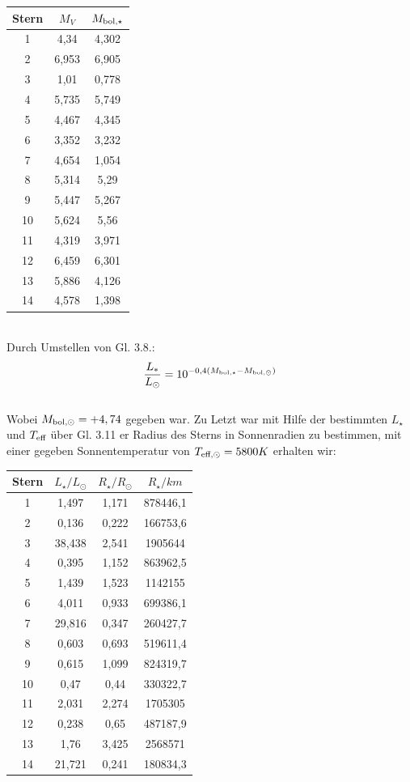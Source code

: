 \documentclass[12pt]{article}
\begin{document}
\newpage\noindent\begin{table}[!ht]
    \centering
    \begin{tabular}{c|c|c}
        Stern & $M_V$ & $M_{\textnormal{bol},\star}$ \\ \hline
        1 & 4,34 & 4,302 \\ 
        2 & 6,953 & 6,905 \\ 
        3 & 1,01 & 0,778 \\ 
        4 & 5,735 & 5,749 \\
        5 & 4,467 & 4,345 \\
        6 & 3,352 & 3,232 \\ 
        7 & 4,654 & 1,054 \\ 
        8 & 5,314 & 5,29 \\ 
        9 & 5,447 & 5,267 \\ 
        10 & 5,624 & 5,56 \\ 
        11 & 4,319 & 3,971 \\ 
        12 & 6,459 & 6,301 \\ 
        13 & 5,886 & 4,126 \\ 
        14 & 4,578 & 1,398 \\ 
    \end{tabular}
\end{table}\\
Durch Umstellen von Gl. 3.8.:
\[\frac{L_*}{L_{\odot}} = 10^{-0,4(M_{\textnormal{bol},\star}-M_{\textnormal{bol},\odot})}\]\\
Wobei $M_{\textnormal{bol},\odot} = +4,74$ gegeben war. Zu Letzt war mit Hilfe der bestimmten $L_\star$ und $T_{\textnormal{eff}}$ über Gl. 3.11 er Radius des Sterns in Sonnenradien zu bestimmen, mit einer gegeben Sonnentemperatur von $T_{\textnormal{eff},\odot} = 5800K$ erhalten wir:
\begin{table}[!ht]
    \centering
    \begin{tabular}{c|c|c|c}
        Stern & $L_\star / L_\odot$ &$R_\star / R_\odot$& $R_\star / km$ \\ \hline
        1 & 1,497 & 1,171 & 878446,1 \\ 
        2 & 0,136 & 0,222 & 166753,6 \\ 
        3 & 38,438 & 2,541 & 1905644 \\ 
        4 & 0,395 & 1,152 & 863962,5 \\ 
        5 & 1,439 & 1,523 & 1142155 \\ 
        6 & 4,011 & 0,933 & 699386,1 \\ 
        7 & 29,816 & 0,347 & 260427,7 \\ 
        8 & 0,603 & 0,693 & 519611,4 \\ 
        9 & 0,615 & 1,099 & 824319,7 \\ 
        10 & 0,47 & 0,44 & 330322,7 \\ 
        11 & 2,031 & 2,274 & 1705305 \\ 
        12 & 0,238 & 0,65 & 487187,9 \\ 
        13 & 1,76 & 3,425 & 2568571 \\ 
        14 & 21,721 & 0,241 & 180834,3 \\ 
    \end{tabular}
\end{table}
\end{document}
